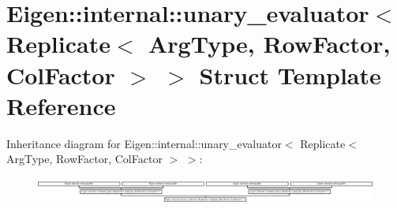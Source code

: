 \hypertarget{struct_eigen_1_1internal_1_1unary__evaluator_3_01_replicate_3_01_arg_type_00_01_row_factor_00_01_col_factor_01_4_01_4}{}\section{Eigen\+:\+:internal\+:\+:unary\+\_\+evaluator$<$ Replicate$<$ Arg\+Type, Row\+Factor, Col\+Factor $>$ $>$ Struct Template Reference}
\label{struct_eigen_1_1internal_1_1unary__evaluator_3_01_replicate_3_01_arg_type_00_01_row_factor_00_01_col_factor_01_4_01_4}
Inheritance diagram for Eigen\+:\+:internal\+:\+:unary\+\_\+evaluator$<$ Replicate$<$ Arg\+Type, Row\+Factor, Col\+Factor $>$ $>$\+:\begin{figure}[H]
\begin{center}
\leavevmode
\includegraphics[height=0.869565cm]{struct_eigen_1_1internal_1_1unary__evaluator_3_01_replicate_3_01_arg_type_00_01_row_factor_00_01_col_factor_01_4_01_4}
\end{center}
\end{figure}
